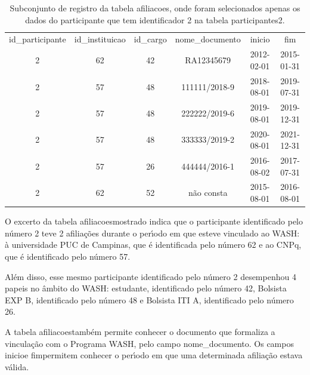 \documentclass[
12pt,		%
openright,	%
twoside,  %
a4paper,			%
chapter=TITLE,		%
english,			%
french,				%
spanish,			%
brazil				%
]{USPSC-classe/USPSC}
\begin{document}
\begin{table}[htb]
\tiny
\caption{\label{e6120545268b93238330297571c4756e7c97df1a}Subconjunto de registro da tabela afiliacoes, onde foram selecionados apenas os dados do participante que tem identificador 2 na tabela participantes2.}

\centering
\begin{tabular}{|c|c|c|c|c|c|}
\hline
id\_participante  &  id\_instituicao  &  id\_cargo  &  nome\_documento  &  inicio      &  fim \\
              2  &              62  &        42  &  RA12345679      &  2012-02-01  &  2015-01-31  \\
              2  &              57  &        48  &  111111/2018-9   &  2018-08-01  &  2019-07-31  \\
              2  &              57  &        48  &  222222/2019-6   &  2019-08-01  &  2019-12-31  \\
              2  &              57  &        48  &  333333/2019-2   &  2020-08-01  &  2021-12-31  \\
              2  &              57  &        26  &  444444/2016-1   &  2016-08-02  &  2017-07-31  \\
              2  &              62  &        52  &  n\~ao consta      &  2015-08-01  &  2016-08-01 \\
\hline
\end{tabular}
\end{table}


O excerto da tabela \textquotedbl afiliacoes\textquotedbl  mostrado indica que o participante identificado pelo n\'umero 2 teve 2 afilia\c{c}\~oes durante o per\'{\i}odo em que esteve vinculado ao WASH: \`a universidade PUC de Campinas, que \'e identificada pelo n\'umero 62 e ao CNPq, que \'e identificado pelo n\'umero 57.









Al\'em disso, esse mesmo participante identificado pelo n\'umero 2 desempenhou 4 papeis no \^ambito do WASH: estudante, identificado pelo n\'umero 42, Bolsista EXP B, identificado pelo n\'umero 48 e Bolsista ITI A, identificado pelo n\'umero 26.









A tabela \textquotedbl afiliacoes\textquotedbl  tamb\'em permite conhecer o documento que formaliza a vincula\c{c}\~ao com o Programa WASH, pelo campo nome\_documento. Os campos \textquotedbl inicio\textquotedbl  e \textquotedbl fim\textquotedbl  permitem conhecer o per\'{\i}odo em que uma determinada afilia\c{c}\~ao estava v\'alida.
\end{document}
